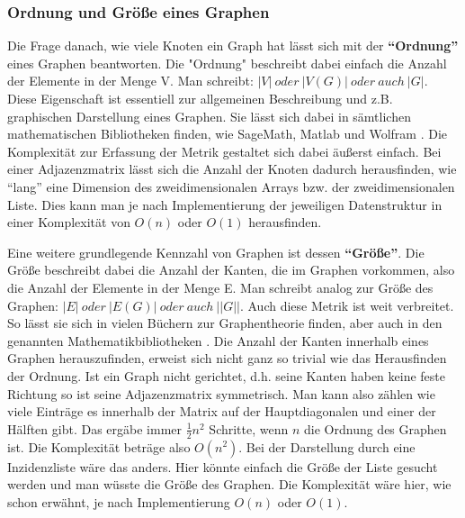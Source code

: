 \documentclass[a4paper,12pt,ngerman,chapterprefix=false,listof=totoc,bibliography=totoc]{scrreprt}
\begin{document}
\subsubsection*{Ordnung und Größe eines Graphen}
{
Die Frage danach, wie viele Knoten ein Graph hat lässt sich mit der \textbf{"`Ordnung"'} eines Graphen beantworten. Die "Ordnung" beschreibt dabei einfach die Anzahl der Elemente in der Menge V. Man schreibt: \(\vert V\vert\ oder\ \vert V(G)\vert\ oder\ auch\ \vert G\vert\). \cite{diestel_graphentheorie_2000} Diese Eigenschaft ist essentiell zur allgemeinen Beschreibung und z.B. graphischen Darstellung eines Graphen. Sie lässt sich dabei in sämtlichen mathematischen Bibliotheken finden, wie SageMath, Matlab und Wolfram \cite{sagemath_graph_2020,matlab_directed_2020,wolfram_graph_2020}. Die Komplexität zur Erfassung der Metrik gestaltet sich dabei äußerst einfach. Bei einer Adjazenzmatrix lässt sich die Anzahl der Knoten dadurch herausfinden, wie "`lang"' eine Dimension des zweidimensionalen Arrays bzw. der zweidimensionalen Liste. Dies kann man je nach Implementierung der jeweiligen Datenstruktur in einer Komplexität von \(O(n)\) oder \(O(1)\) herausfinden.

Eine weitere grundlegende Kennzahl von Graphen ist dessen \textbf{"`Größe"'}. Die Größe beschreibt dabei die Anzahl der Kanten, die im Graphen vorkommen, also die Anzahl der Elemente in der Menge E. Man schreibt analog zur Größe des Graphen: \(\vert E\vert\ oder\ \vert E(G)\vert\ oder\ auch\ \vert\vert G \vert\vert\). \cite{balakrishnan_schaums_1997,diestel_graphentheorie_2000} Auch diese Metrik ist weit verbreitet. So lässt sie sich in vielen Büchern zur Graphentheorie finden, aber auch in den genannten Mathematikbibliotheken \cite{sagemath_graph_2020,matlab_directed_2020,wolfram_graph_2020}. Die Anzahl der Kanten innerhalb eines Graphen herauszufinden, erweist sich nicht ganz so trivial wie das Herausfinden der Ordnung. Ist ein Graph nicht gerichtet, d.h. seine Kanten haben keine feste Richtung \cite{diestel_graphentheorie_2000} so ist seine Adjazenzmatrix symmetrisch. Man kann also zählen wie viele Einträge es innerhalb der Matrix auf der Hauptdiagonalen und einer der Hälften gibt. Das ergäbe immer \(\frac{1}{2}n^2\) Schritte, wenn \(n\) die Ordnung des Graphen ist. Die Komplexität beträge also \(O(n^2)\). Bei der Darstellung durch eine Inzidenzliste wäre das anders. Hier könnte einfach die Größe der Liste gesucht werden und man wüsste die Größe des Graphen. Die Komplexität wäre hier, wie schon erwähnt, je nach Implementierung \(O(n)\) oder \(O(1)\).
}
\end{document}
